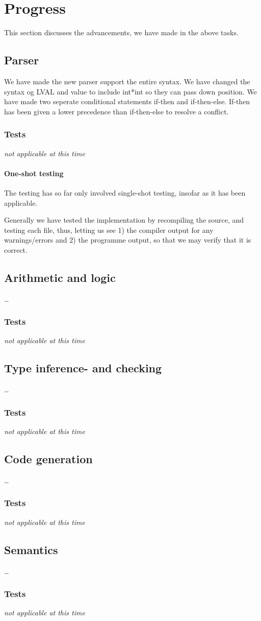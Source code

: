 \documentclass[11pt,a4paper]{article}
\begin{document}
\section{Progress}
This section discusses the advancements, we have made in the above tasks.

\subsection{Parser}
We have made the new parser support the entire syntax.
We have changed the syntax og LVAL and value to include int*int so they can pass down position.
We have made two seperate conditional statements if-then and if-then-else.
If-then has been given a lower precedence than if-then-else to resolve a conflict.

\subsubsection{Tests}
{\it not applicable at this time}%
\paragraph{One-shot testing}
The testing has so far only involved single-shot testing, insofar as it has
been applicable.

Generally we have tested the implementation by recompiling the source, and
testing each file, thus, letting us see 1) the compiler output for any
warnings/errors and 2) the programme output, so that we may verify that it
is correct.

\subsection{Arithmetic and logic}
\ldots

\subsubsection{Tests}
{\it not applicable at this time}%

\subsection{Type inference- and checking}
\ldots

\subsubsection{Tests}
{\it not applicable at this time}%

\subsection{Code generation}
\ldots

\subsubsection{Tests}%
{\it not applicable at this time}%

\subsection{Semantics}
\ldots

\subsubsection{Tests}
{\it not applicable at this time}%
\end{document}
